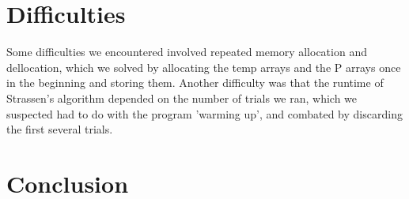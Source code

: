 \documentclass[10pt]{article}
\begin{document}
\section {Difficulties}
Some difficulties we encountered involved repeated memory allocation and dellocation, which we solved by allocating the temp arrays and the P arrays once in the beginning and storing them. Another difficulty was that the runtime of Strassen's algorithm depended on the number of trials we ran, which we suspected had to do with the program 'warming up', and combated by discarding the first several trials. 



\section {Conclusion}
\end{document}
